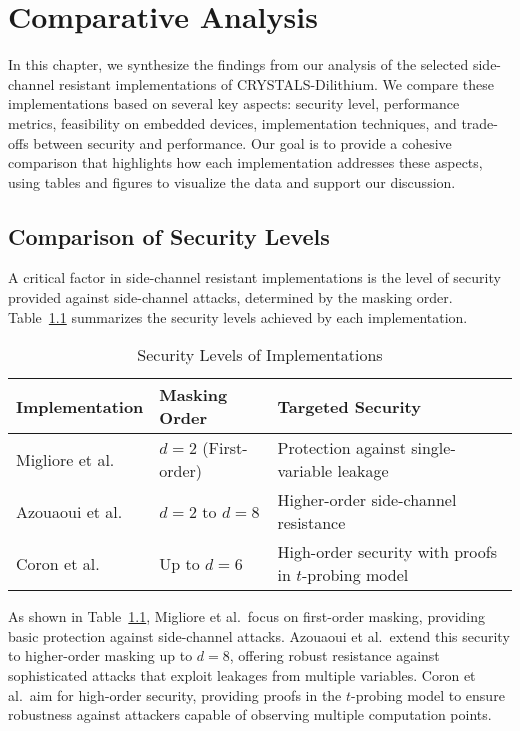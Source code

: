 
\chapter{Comparative Analysis}
\thispagestyle{chapterstart}

In this chapter, we synthesize the findings from our analysis of the selected side-channel resistant implementations of CRYSTALS-Dilithium. We compare these implementations based on several key aspects: security level, performance metrics, feasibility on embedded devices, implementation techniques, and trade-offs between security and performance. Our goal is to provide a cohesive comparison that highlights how each implementation addresses these aspects, using tables and figures to visualize the data and support our discussion.

\section{Comparison of Security Levels}

A critical factor in side-channel resistant implementations is the level of security provided against side-channel attacks, determined by the masking order. Table~\ref{tab:security_levels} summarizes the security levels achieved by each implementation.

\begin{table}[h]
    \centering
    \caption{Security Levels of Implementations}
    \begin{tabular}{l p{3cm} p{6cm}}
        \toprule
        \textbf{Implementation}            & \textbf{Masking Order} & \textbf{Targeted Security}                           \\
        \midrule
        Migliore et al.\ \cite{Migliore19} & $d = 2$ (First-order)  & Protection against single-variable leakage           \\
        Azouaoui et al.\ \cite{Azouaoui22} & $d = 2$ to $d = 8$     & Higher-order side-channel resistance                 \\
        Coron et al.\ \cite{Coron23}       & Up to $d = 6$          & High-order security with proofs in $t$-probing model \\
        \bottomrule
    \end{tabular}
    \label{tab:security_levels}
\end{table}

As shown in Table~\ref{tab:security_levels}, Migliore et al.\ focus on first-order masking, providing basic protection against side-channel attacks. Azouaoui et al.\ extend this security to higher-order masking up to $d=8$, offering robust resistance against sophisticated attacks that exploit leakages from multiple variables. Coron et al.\ aim for high-order security, providing proofs in the $t$-probing model to ensure robustness against attackers capable of observing multiple computation points.

